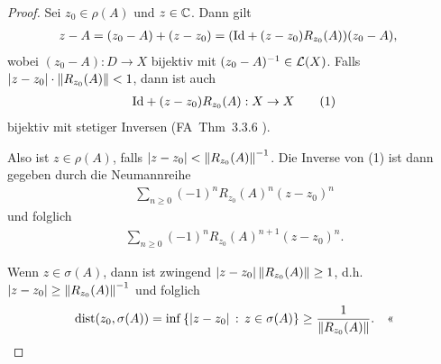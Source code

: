 \begin{proof}
Sei $z_0 \in \rho(A)$ und $z \in \mathbb{C}$. Dann gilt
\begin{align*}
z- A& = (z_0-A) +  (z-z_0) = (\mathrm{Id} + (z-z_0)R_{z_0}(A))(z_0-A),
\end{align*}
wobei $(z_0-A) : D \to X$ bijektiv mit $(z_0-A)^{-1} \in
\mathcal{L}(X)$. Falls $\left|z-z_0\right| \cdot \left\|R_{z_0}(A)\right\| < 1$, dann ist auch
\begin{align*}
\mathrm{Id} + (z-z_0) R_{z_0}(A) : X \to X\tag{1}
\end{align*}
bijektiv mit stetiger Inversen (FA~Thm~3.3.6 \cite{Fun07}).

Also ist $z\in\rho(A)$, falls $\left|z-z_0\right| < \left\|R_{z_0}(A)\right\|^{-1}$. Die
Inverse von (1) ist dann gegeben durch die Neumannreihe
\begin{align*}
\sum_{n\ge 0} (-1)^n R_{z_0}(A)^n(z-z_0)^n
\end{align*}
und folglich
\begin{align*}
\sum_{n\ge 0} (-1)^n R_{z_0}(A)^{n+1}(z-z_0)^n.
\end{align*}

Wenn $z\in\sigma(A)$, dann ist zwingend $\left|z-z_0\right|\left\|R_{z_0}(A)\right\| \ge 1$,
d.h. $\left|z-z_0\right|\ge \left\|R_{z_0}(A)\right\|^{-1}$ und folglich
\begin{align*}
\mathrm{dist}(z_0,\sigma(A)) = 
\inf\left\{ \left|z-z_0\right|\,:\,z\in\sigma(A)\right\} \ge
\frac{1}{\left\|R_{z_0}(A)\right\|}.\quad\text{<<}
\end{align*}
\end{proof}


